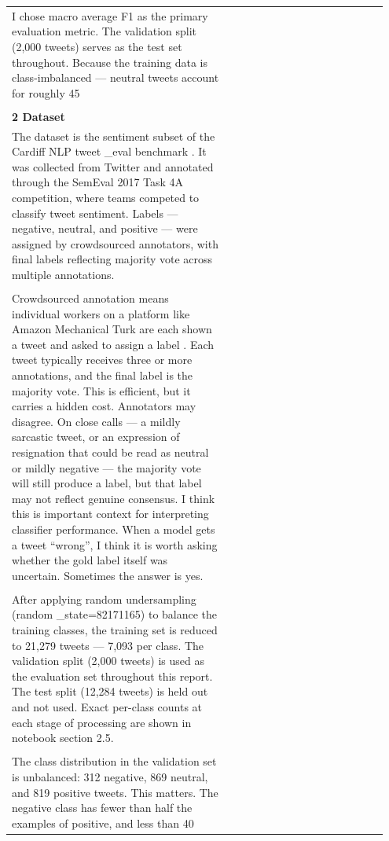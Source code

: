\documentclass[11pt]{article}
\begin{document}
\begin{longtable}{|p{0.55\linewidth}|p{0.40\linewidth}|}
\hline
\rule{0pt}{3.5cm} & \\
\hline
I chose macro average F1 as the primary evaluation metric. The validation split (2,000 tweets) serves as the test set throughout. Because the training data is class-imbalanced --- neutral tweets account for roughly 45 & \\[2pt]
\hline
\rule{0pt}{3.5cm} & \\
\hline
\multicolumn{2}{|l|}{\textbf{2 Dataset}} \\[2pt]
\hline
The dataset is the sentiment subset of the Cardiff NLP tweet \_eval benchmark . It was collected from Twitter and annotated through the SemEval 2017 Task 4A competition, where teams competed to classify tweet sentiment. Labels --- negative, neutral, and positive --- were assigned by crowdsourced annotators, with final labels reflecting majority vote across multiple annotations. & \\[2pt]
\hline
\rule{0pt}{3.5cm} & \\
\hline
Crowdsourced annotation means individual workers on a platform like Amazon Mechanical Turk are each shown a tweet and asked to assign a label . Each tweet typically receives three or more annotations, and the final label is the majority vote. This is efficient, but it carries a hidden cost. Annotators may disagree. On close calls --- a mildly sarcastic tweet, or an expression of resignation that could be read as neutral or mildly negative --- the majority vote will still produce a label, but that label may not reflect genuine consensus. I think this is important context for interpreting classifier performance. When a model gets a tweet ``wrong'', I think it is worth asking whether the gold label itself was uncertain. Sometimes the answer is yes. & \\[2pt]
\hline
\rule{0pt}{3.5cm} & \\
\hline
After applying random undersampling (random \_state=82171165) to balance the training classes, the training set is reduced to 21,279 tweets --- 7,093 per class. The validation split (2,000 tweets) is used as the evaluation set throughout this report. The test split (12,284 tweets) is held out and not used. Exact per-class counts at each stage of processing are shown in notebook section 2.5. & \\[2pt]
\hline
\rule{0pt}{3.5cm} & \\
\hline
The class distribution in the validation set is unbalanced: 312 negative, 869 neutral, and 819 positive tweets. This matters. The negative class has fewer than half the examples of positive, and less than 40 & \\[2pt]

\end{longtable}
\end{document}
